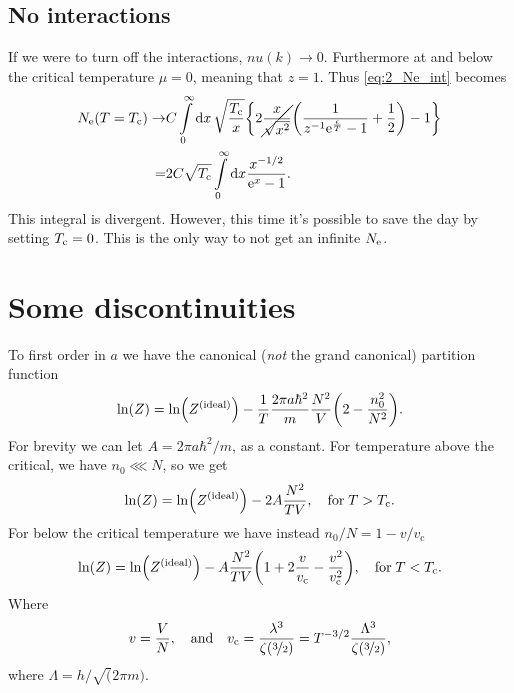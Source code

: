 \documentclass[11pt,letter, swedish, english
]{article}
\renewcommand{\thesubsection}{\arabic{section} (\alph{subsection})}
\begin{document}

\subsection*{No interactions}
If we were to turn off the interactions, $nu(k)\to0$. Furthermore at
and below the critical temperature $\mu=0$, meaning that $z=1$. Thus 
\eqref{eq:2_Ne_int} becomes
\begin{equation}
\begin{aligned}
\Ne(T=\Tc)\to& C\int_0^\infty\rd{x}\,\sqrt{\frac{\Tc}{x}}
\qty{2\cancel{\frac{x}{\sqrt{x^2}}}
\qty(\frac{1}{z^{-1}\ee^{\frac{\epsilon}{T}}-1}+\frac{1}{2})-1}\\
=&2C\sqrt{\Tc} \int_0^\infty\rd{x}
\frac{x^{-1/2}}{\ee^{x}-1}.
\end{aligned}
\end{equation}
This integral is divergent. However, this time it's possible to save
the day by setting $T_{\text{c}}=0$. This is the only way to not get an
infinite $N_{\text{e}}$.

\section{Some discontinuities}
\renewcommand{\thesubsection}{\arabic{section} (\alph{subsection})}
\newcommand{\ideal}[1]{#1^\text{{(ideal)}}}
\newcommand{\vc}{v_{\text{c}}}
\newcommand{\lc}{\lambda_{\text{c}}}

To first order in $a$ we have the canonical (\emph{not} the grand
canonical) partition function 
\begin{equation}
\ln(Z)=\ln(\ideal{Z})-\frac{1}{T}\frac{2\pi a\hbar^2}{m}\frac{N^2}{V}
\qty(2-\frac{n_0^2}{N^2}).
\end{equation}
For brevity we can let $A=2\pi a\hbar^2/m$, as a constant. For
temperature above the critical, we have $n_0\lll N$, so we get
\begin{equation}
\ln(Z)=\ln(\ideal{Z})-2A\frac{N^2}{TV}\qcomma
\text{for}\;T>\Tc.
\end{equation}
For below the critical temperature we have instead $n_0/N=1-v/\vc$
\begin{equation}
\ln(Z)=\ln(\ideal{Z})
-A\frac{N^2}{TV}\qty(1+2\frac{v}{\vc}-\frac{v^2}{\vc^2})\qcomma
\text{for}\;T<\Tc.
\end{equation}
Where
\begin{equation}\label{eq:3_v_vc}
v=\frac{V}{N}\qcomma\text{and}\quad
\vc=\frac{\lambda^3}{\zeta(\nicefrac{3}{2})}
=T^{-3/2}\frac{\Lambda^3}{\zeta(\nicefrac{3}{2})},
\end{equation}
where $\Lambda=h/\sqrt(2\pi m)$.
\end{document}
